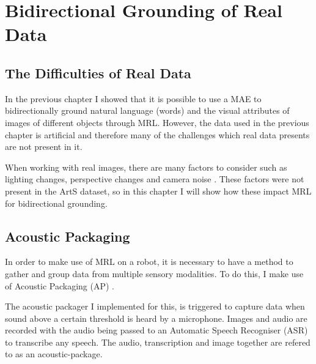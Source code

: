 
\chapter{Bidirectional Grounding of Real Data} %

\label{Chapter6} %


\section{The Difficulties of Real Data}
In the previous chapter I showed that it is possible to use a MAE to bidirectionally ground natural language (words) and the visual attributes of images of different objects through MRL. However, the data used in the previous chapter is artificial and therefore many of the challenges which real data presents are not present in it. 

When working with real images, there are many factors to consider such as lighting changes, perspective changes and camera noise \cite{keller2016analysis}. These factors were not present in the ArtS dataset, so in this chapter I will show how these impact MRL for bidirectional grounding.

\section{Acoustic Packaging}
In order to make use of MRL on a robot, it is necessary to have a method to gather and group data from multiple sensory modalities. To do this, I make use of Acoustic Packaging (AP) \cite{schillingmann2009towards, schillingmann2009computational}.

The acoustic packager I implemented for this, is triggered to capture data when sound above a certain threshold is heard by a microphone. Images and audio are recorded with the audio being passed to an Automatic Speech Recogniser (ASR) to transcribe any speech. The audio, transcription and image together are refered to as an acoustic-package.


